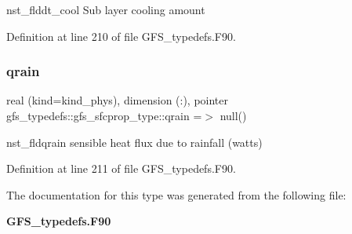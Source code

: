 nst\+\_\+flddt\+\_\+cool Sub layer cooling amount 



Definition at line 210 of file G\+F\+S\+\_\+typedefs.\+F90.

\mbox{\label{structgfs__typedefs_1_1gfs__sfcprop__type_a52e61e5f5f3fd3c6cc83ff1ea0f87c96}} 
\subsubsection{qrain}
{\footnotesize\ttfamily real (kind=kind\+\_\+phys), dimension  (\+:), pointer gfs\+\_\+typedefs\+::gfs\+\_\+sfcprop\+\_\+type\+::qrain =$>$ null()}



nst\+\_\+fldqrain sensible heat flux due to rainfall (watts) 



Definition at line 211 of file G\+F\+S\+\_\+typedefs.\+F90.



The documentation for this type was generated from the following file\+:\begin{DoxyCompactItemize}
\item 
\textbf{ G\+F\+S\+\_\+typedefs.\+F90}\end{DoxyCompactItemize}
